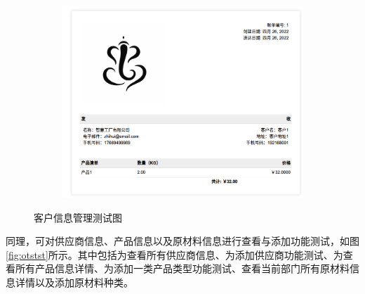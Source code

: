 \begin{figure}[H]
\begin{subfigure}{.35\textwidth}
    \end{subfigure}
    \qquad
    \begin{subfigure}{.35\textwidth}
        \centering
        \includegraphics[width=\textwidth]{figures/6orderdetails.png}
    \end{subfigure}
    \caption{客户信息管理测试图}
    \label{fig:cstmtst}
\end{figure}

同理，可对供应商信息、产品信息以及原材料信息进行查看与添加功能测试，如图\ref{fig:otstst}所示。其中包括为查看所有供应商信息、为添加供应商功能测试、为查看所有产品信息详情、为添加一类产品类型功能测试、查看当前部门所有原材料信息详情以及添加原材料种类。

